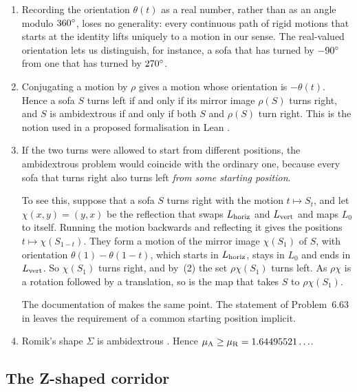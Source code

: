 \begin{rem}\label{rem:definitions}
\leavevmode
\begin{enumerate}[label=(\arabic*),leftmargin=*]
\item Recording the orientation $\theta(t)$ as a real number, rather than as an angle modulo $360^{\circ}$, loses no generality: every continuous path of rigid motions that starts at the identity lifts uniquely to a motion in our sense. The real-valued orientation lets us distinguish, for instance, a sofa that has turned by $-90^{\circ}$ from one that has turned by $270^{\circ}$.

\item Conjugating a motion by $\rho$ gives a motion whose orientation is $-\theta(t)$. Hence a sofa $S$ turns left if and only if its mirror image $\rho(S)$ turns right, and $S$ is ambidextrous if and only if both $S$ and $\rho(S)$ turn right. This is the notion used in a proposed formalisation in Lean \cite{fc_pr6424}.

\item If the two turns were allowed to start from different positions, the ambidextrous problem would coincide with the ordinary one, because every sofa that turns right also turns left \emph{from some starting position}.

To see this, suppose that a sofa $S$ turns right with the motion $t\mapsto S_t$, and let $\chi(x,y)=(y,x)$ be the reflection that swaps $L_{\mathrm{horiz}}$ and $L_{\mathrm{vert}}$ and maps $L_0$ to itself. Running the motion backwards and reflecting it gives the positions $t\mapsto\chi(S_{1-t})$. They form a motion of the mirror image $\chi(S_1)$ of $S$, with orientation $\theta(1)-\theta(1-t)$, which starts in $L_{\mathrm{horiz}}$, stays in $L_0$ and ends in $L_{\mathrm{vert}}$. So $\chi(S_1)$ turns right, and by~(2) the set $\rho\chi(S_1)$ turns left. As $\rho\chi$ is a rotation followed by a translation, so is the map that takes $S$ to $\rho\chi(S_1)$.

The documentation of \cite{fc_pr6424} makes the same point. The statement of Problem~6.63 in \cite{georgiev2025alphaevolve} leaves the requirement of a common starting position implicit.

\item Romik's shape $\Sigma$ is ambidextrous \cite[Theorem~5]{romik2018}. Hence $\mu_{\mathrm{A}}\ge\mu_{\mathrm{R}}=1.64495521\ldots$.
\end{enumerate}
\end{rem}

\subsection{The Z-shaped corridor}\label{sec:zcorridor}

